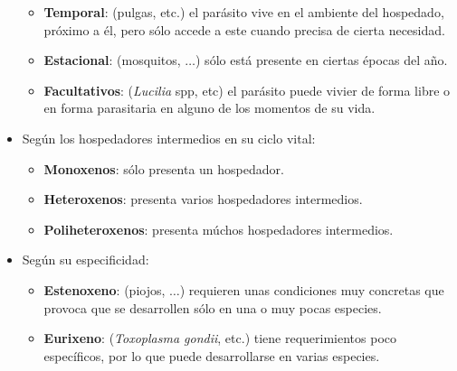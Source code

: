 \begin{itemize}[itemsep=0pt,parsep=0pt,topsep=0pt,partopsep=0pt]
\begin{itemize}[itemsep=0pt,parsep=0pt,topsep=0pt,partopsep=0pt]
		\item\textbf{Temporal}: (pulgas, etc.) el parásito vive en el ambiente del hospedado, próximo a él, pero sólo accede a este cuando precisa de cierta necesidad.
		\item\textbf{Estacional}: (mosquitos, $\dots$) sólo está presente en ciertas épocas del año.
		\item\textbf{Facultativos}: (\textit{Lucilia} spp, etc) el parásito puede vivier de forma libre o en forma parasitaria en alguno de los momentos de su vida.
	\end{itemize}
	\item Según los hospedadores intermedios en su ciclo vital:
	\begin{itemize}[itemsep=0pt,parsep=0pt,topsep=0pt,partopsep=0pt]
		\item \textbf{Monoxenos}: sólo presenta un hospedador.
		\item\textbf{Heteroxenos}: presenta varios hospedadores intermedios.
		\item\textbf{Poliheteroxenos}: presenta múchos hospedadores intermedios.
	\end{itemize}
	\item Según su especificidad:
	\begin{itemize}[itemsep=0pt,parsep=0pt,topsep=0pt,partopsep=0pt]
		\item \textbf{Estenoxeno}: (piojos, $\dots$) requieren unas condiciones muy concretas que provoca que se desarrollen sólo en una o muy pocas especies.
		\item\textbf{Eurixeno}: (\textit{Toxoplasma gondii}, etc.) tiene requerimientos poco específicos, por lo que puede desarrollarse en varias especies.
	\end{itemize}
\end{itemize}
